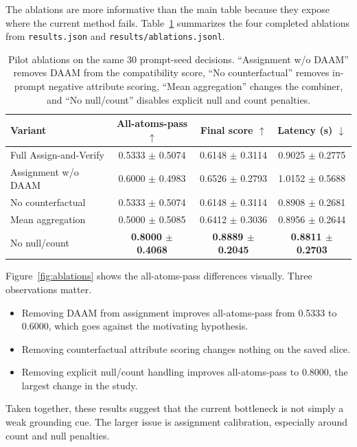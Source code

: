 \documentclass{article}
\newcommand{\method}{Assign-and-Verify\xspace}
\newcommand{\daam}{DAAM\xspace}
\begin{document}
The ablations are more informative than the main table because they expose where the current method fails. Table~\ref{tab:ablations} summarizes the four completed ablations from \texttt{results.json} and \texttt{results/ablations.jsonl}.

\begin{table}[t]
\caption{Pilot ablations on the same 30 prompt-seed decisions. ``Assignment w/o \daam'' removes \daam from the compatibility score, ``No counterfactual'' removes in-prompt negative attribute scoring, ``Mean aggregation'' changes the combiner, and ``No null/count'' disables explicit null and count penalties.}
\label{tab:ablations}
\centering
\small
\begin{tabular}{lccc}
\toprule
Variant & All-atoms-pass $\uparrow$ & Final score $\uparrow$ & Latency (s) $\downarrow$ \\
\midrule
Full \method & 0.5333 $\pm$ 0.5074 & 0.6148 $\pm$ 0.3114 & 0.9025 $\pm$ 0.2775 \\
Assignment w/o \daam & 0.6000 $\pm$ 0.4983 & 0.6526 $\pm$ 0.2793 & 1.0152 $\pm$ 0.5688 \\
No counterfactual & 0.5333 $\pm$ 0.5074 & 0.6148 $\pm$ 0.3114 & 0.8908 $\pm$ 0.2681 \\
Mean aggregation & 0.5000 $\pm$ 0.5085 & 0.6412 $\pm$ 0.3036 & 0.8956 $\pm$ 0.2644 \\
No null/count & \textbf{0.8000 $\pm$ 0.4068} & \textbf{0.8889 $\pm$ 0.2045} & \textbf{0.8811 $\pm$ 0.2703} \\
\bottomrule
\end{tabular}
\end{table}

Figure~\ref{fig:ablations} shows the all-atoms-pass differences visually. Three observations matter.
\begin{itemize}[leftmargin=*,topsep=2pt,itemsep=2pt]
  \item Removing \daam from assignment improves all-atoms-pass from 0.5333 to 0.6000, which goes against the motivating hypothesis.
  \item Removing counterfactual attribute scoring changes nothing on the saved slice.
  \item Removing explicit null/count handling improves all-atoms-pass to 0.8000, the largest change in the study.
\end{itemize}

Taken together, these results suggest that the current bottleneck is not simply a weak grounding cue. The larger issue is assignment calibration, especially around count and null penalties.
\end{document}

